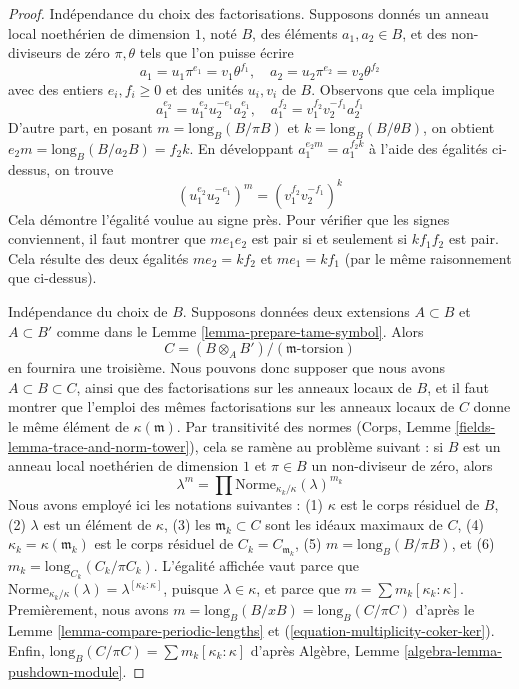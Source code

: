 \begin{proof}
Indépendance du choix des factorisations. Supposons donnés
un anneau local noethérien de dimension $1$, noté $B$, des éléments $a_1, a_2 \in B$,
et des non-diviseurs de zéro $\pi, \theta$ tels que l'on puisse écrire
$$
a_1 = u_1 \pi^{e_1} = v_1 \theta^{f_1},\quad
a_2 = u_2 \pi^{e_2} = v_2 \theta^{f_2}
$$
avec des entiers $e_i, f_i \geq 0$ et des unités $u_i, v_i$ de $B$.
Observons que cela implique
$$
a_1^{e_2} = u_1^{e_2}u_2^{-e_1}a_2^{e_1},\quad
a_1^{f_2} = v_1^{f_2}v_2^{-f_1}a_2^{f_1}
$$
D'autre part, en posant
$m = \text{long}_B(B/\pi B)$ et $k = \text{long}_B(B/\theta B)$,
on obtient $e_2 m = \text{long}_B(B/a_2 B) = f_2 k$.
En développant $a_1^{e_2m} = a_1^{f_2 k}$ à l'aide des égalités ci-dessus, on trouve
$$
(u_1^{e_2}u_2^{-e_1})^m =  (v_1^{f_2}v_2^{-f_1})^k
$$
Cela démontre l'égalité voulue au signe près. Pour vérifier que les signes
conviennent, il faut montrer que $me_1e_2$ est pair si et seulement si
$kf_1f_2$ est pair. Cela résulte des deux égalités $me_2 = kf_2$ et
$me_1 = kf_1$ (par le même raisonnement que ci-dessus).

\medskip\noindent
Indépendance du choix de $B$. Supposons données deux extensions
$A \subset B$ et $A \subset B'$ comme dans le Lemme \ref{lemma-prepare-tame-symbol}.
Alors
$$
C = (B \otimes_A B')/(\mathfrak m\text{-torsion})
$$
en fournira une troisième. Nous pouvons donc supposer que nous avons
$A \subset B \subset C$, ainsi que des factorisations sur les
anneaux locaux de $B$, et il faut montrer que l'emploi
des mêmes factorisations sur les anneaux locaux de $C$
donne le même élément de $\kappa(\mathfrak m)$.
Par transitivité des normes
(Corps, Lemme \ref{fields-lemma-trace-and-norm-tower}),
cela se ramène au problème suivant :
si $B$ est un anneau local noethérien de dimension $1$
et $\pi \in B$ un non-diviseur de zéro, alors
$$
\lambda^m = \prod \text{Norme}_{\kappa_k/\kappa}(\lambda)^{m_k}
$$
Nous avons employé ici les notations suivantes :
(1) $\kappa$ est le corps résiduel de $B$,
(2) $\lambda$ est un élément de $\kappa$,
(3) les $\mathfrak m_k \subset C$ sont les idéaux maximaux de $C$,
(4) $\kappa_k = \kappa(\mathfrak m_k)$ est le corps résiduel de
$C_k = C_{\mathfrak m_k}$,
(5) $m = \text{long}_B(B/\pi B)$, et
(6) $m_k = \text{long}_{C_k}(C_k/\pi C_k)$.
L'égalité affichée vaut parce que
$\text{Norme}_{\kappa_k/\kappa}(\lambda) = \lambda^{[\kappa_k : \kappa]}$,
puisque $\lambda \in \kappa$, et parce que $m = \sum m_k[\kappa_k:\kappa]$.
Premièrement, nous avons $m = \text{long}_B(B/xB) = \text{long}_B(C/\pi C)$
d'après le Lemme \ref{lemma-compare-periodic-lengths} 
et (\ref{equation-multiplicity-coker-ker}).
Enfin, $\text{long}_B(C/\pi C) = \sum m_k[\kappa_k:\kappa]$
d'après Algèbre, Lemme \ref{algebra-lemma-pushdown-module}.
\end{proof}


